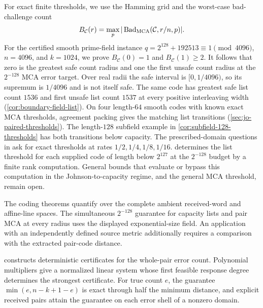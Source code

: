 For exact finite thresholds, we use the Hamming grid and the worst-case
bad-challenge count
\[
  B_{\mathcal C}(r)=\max_p
  |\operatorname{Bad}_{\operatorname{MCA}}(\mathcal C,r/n,p)|.
\]
For the certified smooth prime-field instance
\(q=2^{128}+192513\equiv1\pmod {4096}\), \(n=4096\), and \(k=1024\), we prove
\(B_{\mathcal C}(0)=1\) and \(B_{\mathcal C}(1)\ge2\).  It follows that zero
is the greatest safe count radius and one the first unsafe count radius at
the \(2^{-128}\) MCA error target. Over real radii the safe interval is
\([0,1/4096)\), so its supremum is \(1/4096\) and is not itself safe.
The same code has greatest safe list count \(1536\) and first unsafe list
count \(1537\) at every positive interleaving width
(\cref{cor:boundary-field-list}).
On four length-\(64\) smooth codes with known exact MCA thresholds,
agreement packing gives the matching list transitions
(\cref{sec:jo-paired-thresholds}). The length-\(128\) subfield example
in \cref{cor:subfield-128-thresholds} has both transitions below capacity.
The prescribed-domain questions in \cite{arnonBonehFenzi2026} ask for
exact thresholds at rates \(1/2,1/4,1/8,1/16\).
 determines the list threshold for each supplied
code of length below \(2^{127}\) at the \(2^{-128}\) budget by a finite rank
computation. General bounds that evaluate or bypass this computation in the
Johnson-to-capacity regime, and the general MCA threshold, remain open.

The coding theorems quantify over the complete ambient received-word and
affine-line spaces.  The simultaneous \(2^{-128}\) guarantee for capacity
lists and pair MCA at every radius uses the displayed exponential-size field.
An application with an independently defined source metric additionally
requires a comparison with the extracted pair-code distance.

 constructs deterministic certificates for
the whole-pair error count. Polynomial multipliers give a normalized linear
system whose first feasible response degree determines the strongest
certificate. For true count \(e\), the guarantee \(\min(e,n-k+1-e)\) is
exact through half the minimum distance, and explicit received pairs attain
the guarantee on each error shell of a nonzero domain.

